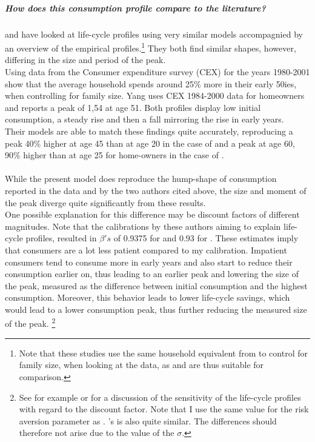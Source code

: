 \documentclass[12pt,a4paper,leqno]{article}
\theoremstyle{definition}
\begin{document}
\subparagraph{How does this consumption profile compare to the literature?} \cite{FV&K2011} and \cite{yang2009} have looked at life-cycle profiles using very similar models accompagnied by an overview of the empirical profiles.\footnote{Note that these studies use the same household equivalent from \cite{fernandez2007consumption} to control for family size, when looking at the data, as \cite{hintermaier2011} and are thus suitable for comparison.} They both find similar shapes, however, differing in the size and period of the peak.\\
Using data from the Consumer expenditure survey (CEX) for the years 1980-2001 \cite{FV&K2011} show that the average household spends around 25\% more in their early 50ies, when controlling for family size. Yang uses CEX 1984-2000 data for homeowners and reports a peak of 1,54 at age 51. Both profiles display low initial consumption, a steady rise and then a fall mirroring the rise in early years. \\
Their models are able to match these findings quite accurately, reproducing a peak 40\% higher at age 45 than at age 20 in the case of \citep{FV&K2011} and a peak at age 60, 90\% higher than at age 25 for home-owners in the case of \cite{yang2009}. 
\\ \\
While the present model does reproduce the hump-shape of consumption reported in the data and by the two authors cited above, the size and moment of the peak diverge quite significantly from these results. \\
One possible explanation for this difference may be discount factors of different magnitudes. Note that the calibrations by these authors aiming to explain life-cycle profiles, resulted in $\beta 's$ of 0.9375 for \cite{FV&K2011} and 0.93 for \cite{yang2009}. These estimates imply that consumers are a lot less patient compared to my calibration. Impatient consumers tend to consume more in early years and also start to reduce their consumption earlier on, thus leading to an earlier peak and lowering the size of the peak, measured as the difference between initial consumption and the highest consumption. Moreover, this behavior leads to lower life-cycle savings, which would lead to a lower consumption peak, thus further reducing the measured size of the peak. \footnote{See for example \citep{Gourinchas&Parker2002} or \cite{cagetti2003} for a discussion of the sensitivity of the life-cycle profiles with regard to the discount factor. Note that I use the same value for the risk aversion parameter as \cite{yang2009}. \cite{FV&K2011}'s is also quite similar. The differences should therefore not arise due to the value of the $\sigma$.}
\end{document}
